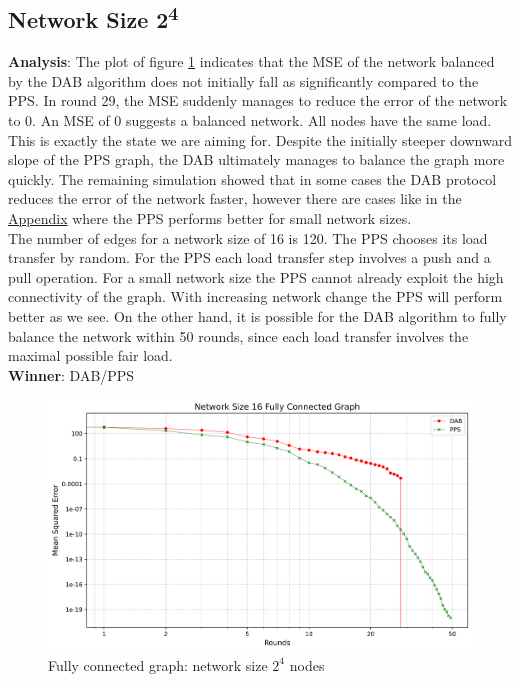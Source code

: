 \subsection{Network Size 2\textsuperscript{4}}
\textbf{Analysis}: The plot of figure \ref{fig:16CompleteGraph} indicates that the MSE of the network balanced by the DAB algorithm does not initially fall as significantly compared to the PPS. In round 29, the MSE suddenly manages to reduce the error of the network to 0. An MSE of 0 suggests a balanced network. All nodes have the same load. This is exactly the state we are aiming for. Despite the initially steeper downward slope of the PPS graph, the DAB ultimately manages to balance the graph more quickly. The remaining simulation showed that in some cases the DAB protocol reduces the error of the network faster, however there are cases like in the \hyperref[chap:appendix]{Appendix} where the PPS performs better for small network sizes. \\
The number of edges for a network size of 16 is 120. The PPS chooses its load transfer by random. For the PPS each load transfer step involves a push and a pull operation. For a small network size the PPS cannot already exploit the high connectivity of the graph. With increasing network change the PPS will perform better as we see. On the other hand, it is possible for the DAB algorithm to fully balance the network within 50 rounds, since each load transfer involves the maximal possible fair load. \\
\textbf{Winner}: DAB/PPS\\
\begin{figure}[H]
    \centering
    \includegraphics[scale=0.5]{figures/completeGraphSimulations/DAB_vs_PPS_FCG_r50_n16.png}
    \caption{Fully connected graph: network size $2^{4}$ nodes}
    \label{fig:16CompleteGraph}
\end{figure}

